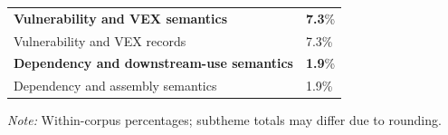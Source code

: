 \begin{table}[t]
\begin{tabular}{@{}ll@{}}
\textbf{Vulnerability and VEX semantics} & \textbf{7.3}\% \\
\hspace{1.5em}Vulnerability and VEX records & 7.3\% \\

\textbf{Dependency and downstream-use semantics} & \textbf{1.9}\% \\
\hspace{1.5em}Dependency and assembly semantics & 1.9\% \\

\bottomrule
\end{tabular}
\par
{\scriptsize\emph{Note:} Within-corpus percentages; subtheme totals may differ due to rounding.}
\end{table}
